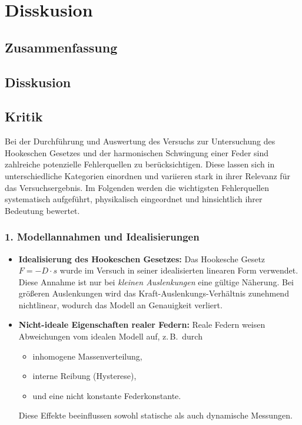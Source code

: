 \chapter{Disskusion}

\section{Zusammenfassung}

\section{Disskusion}

\section{Kritik}
Bei der Durchführung und Auswertung des Versuchs zur Untersuchung des Hookeschen Gesetzes und der harmonischen Schwingung einer Feder sind zahlreiche potenzielle Fehlerquellen zu berücksichtigen. Diese lassen sich in unterschiedliche Kategorien einordnen und variieren stark in ihrer Relevanz für das Versuchsergebnis. Im Folgenden werden die wichtigsten Fehlerquellen systematisch aufgeführt, physikalisch eingeordnet und hinsichtlich ihrer Bedeutung bewertet.

\subsection*{1. Modellannahmen und Idealisierungen}

\begin{itemize}
    \item \textbf{Idealisierung des Hookeschen Gesetzes:} Das Hookesche Gesetz $F = -D \cdot s$ wurde im Versuch in seiner idealisierten linearen Form verwendet. Diese Annahme ist nur bei \emph{kleinen Auslenkungen} eine gültige Näherung. Bei größeren Auslenkungen wird das Kraft-Auslenkungs-Verhältnis zunehmend nichtlinear, wodurch das Modell an Genauigkeit verliert.
    
    \item \textbf{Nicht-ideale Eigenschaften realer Federn:} Reale Federn weisen Abweichungen vom idealen Modell auf, z.\,B.\ durch
    \begin{itemize}
        \item inhomogene Massenverteilung,
        \item interne Reibung (Hysterese),
        \item und eine nicht konstante Federkonstante.
    \end{itemize}
    Diese Effekte beeinflussen sowohl statische als auch dynamische Messungen.
\end{itemize}

